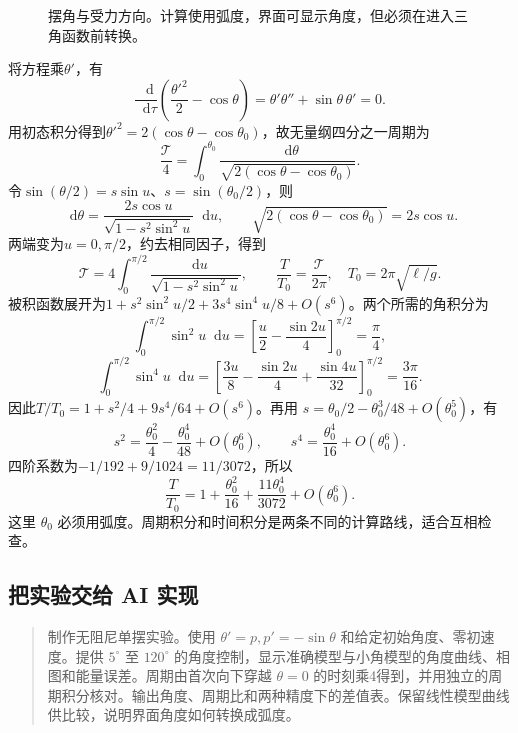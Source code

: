 \documentclass[11pt,openany,fontset=fandol]{ctexbook}
\theoremstyle{plain}\newtheorem{theorem}{定理}[chapter]\newtheorem{proposition}[theorem]{命题}
\theoremstyle{definition}\newtheorem{definition}{定义}[chapter]\newtheorem{example}{例}[chapter]
\theoremstyle{remark}\newtheorem*{remark}{说明}
\newcommand{\dd}{\mathop{}\!\mathrm d}\newcommand{\ii}{\mathrm i}\newcommand{\ee}{\mathrm e}
\begin{document}
\begin{figure}[htbp]\centering
{}
\caption{摆角与受力方向。计算使用弧度，界面可显示角度，但必须在进入三角函数前转换。}
\label{fig:orig-084}
\end{figure}

将方程乘$\theta'$，有
\[\frac{\dd}{\dd\tau}\left(\frac{\theta'^2}{2}-\cos\theta\right)
=\theta'\theta''+\sin\theta\,\theta'=0.\]
用初态积分得到$\theta'^2=2(\cos\theta-\cos\theta_0)$，故无量纲四分之一周期为
\[\frac{\mathcal T}{4}=\int_0^{\theta_0}
\frac{\dd\theta}{\sqrt{2(\cos\theta-\cos\theta_0)}}.\]
令$\sin(\theta/2)=s\sin u$、$s=\sin(\theta_0/2)$，则
\[\dd\theta=\frac{2s\cos u}{\sqrt{1-s^2\sin^2u}}\dd u,\qquad
\sqrt{2(\cos\theta-\cos\theta_0)}=2s\cos u.\]
两端变为$u=0,\pi/2$，约去相同因子，得到
\begin{equation}\label{eq:pendulum-period}
\mathcal T=4\int_0^{\pi/2}\frac{\dd u}{\sqrt{1-s^2\sin^2u}},\qquad
\frac T{T_0}=\frac{\mathcal T}{2\pi},\quad T_0=2\pi\sqrt{\ell/g}.
\end{equation}
被积函数展开为$1+s^2\sin^2u/2+3s^4\sin^4u/8+O(s^6)$。两个所需的角积分为
\[\int_0^{\pi/2}\sin^2u\dd u
=\left[\frac u2-\frac{\sin2u}{4}\right]_0^{\pi/2}=\frac\pi4,\]
\[\int_0^{\pi/2}\sin^4u\dd u
=\left[\frac{3u}{8}-\frac{\sin2u}{4}+\frac{\sin4u}{32}\right]_0^{\pi/2}
=\frac{3\pi}{16}.\]
因此$T/T_0=1+s^2/4+9s^4/64+O(s^6)$。再用
$s=\theta_0/2-\theta_0^3/48+O(\theta_0^5)$，有
\[s^2=\frac{\theta_0^2}{4}-\frac{\theta_0^4}{48}+O(\theta_0^6),\qquad
s^4=\frac{\theta_0^4}{16}+O(\theta_0^6).\]
四阶系数为$-1/192+9/1024=11/3072$，所以
\[
\frac T{T_0}=1+\frac{\theta_0^2}{16}+\frac{11\theta_0^4}{3072}+O(\theta_0^6).
\]
这里 $\theta_0$ 必须用弧度。周期积分和时间积分是两条不同的计算路线，适合互相检查。

\subsection{把实验交给 AI 实现}
\begin{quote}\small
制作无阻尼单摆实验。使用 $\theta'=p,p'=-\sin\theta$ 和给定初始角度、零初速度。提供 $5^\circ$ 至 $120^\circ$ 的角度控制，显示准确模型与小角模型的角度曲线、相图和能量误差。周期由首次向下穿越 $\theta=0$ 的时刻乘4得到，并用独立的周期积分核对。输出角度、周期比和两种精度下的差值表。保留线性模型曲线供比较，说明界面角度如何转换成弧度。
\end{quote}
\end{document}
